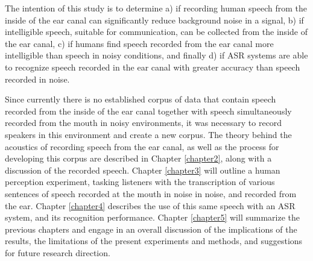 The intention of this study is to determine a) if recording human speech from the inside of the ear canal can significantly reduce background noise in a signal, b) if intelligible speech, suitable for communication, can be collected from the inside of the ear canal, c) if humans find speech recorded from the ear canal more intelligible than speech in noisy conditions, and finally d) if ASR systems are able to recognize speech recorded in the ear canal with greater accuracy than speech recorded in noise.
	
Since currently there is no established corpus of data that contain speech recorded from the inside of the ear canal together with speech simultaneously recorded from the mouth in noisy environments, it was necessary to record speakers in this environment and create a new corpus.  The theory behind the acoustics of recording speech from the ear canal, as well as the process for developing this corpus are described in Chapter \ref{chapter2}, along with a discussion of the recorded speech.  Chapter \ref{chapter3} will outline a human perception experiment, tasking listeners with the transcription of various sentences of speech recorded at the mouth in noise in noise, and recorded from the ear.   Chapter \ref{chapter4} describes the use of this same speech with an ASR system, and its recognition performance.  Chapter \ref{chapter5} will summarize the previous chapters and engage in an overall discussion of the implications of the results, the limitations of the present experiments and methods, and suggestions for future research direction.


